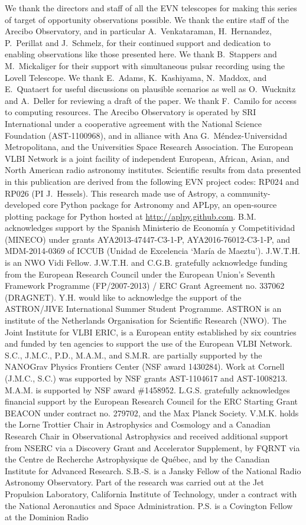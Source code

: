 \documentclass[twocolumn]{aastex61}
\begin{document}
We thank the directors and staff of all the EVN telescopes for making this series of target of opportunity observations possible. We thank the entire staff of the Arecibo Observatory, and in particular A.~Venkataraman, H.~Hernandez, P.~Perillat and J.~Schmelz, for their continued support and dedication to enabling observations like those presented here.  We thank B.~Stappers and M.~Mickaliger for their support with simultaneous pulsar recording using the Lovell Telescope. We thank E.~Adams, K.~Kashiyama, N.~Maddox, and E.~Quataert for useful discussions on plausible scenarios as well as O.~Wucknitz and A.~Deller for reviewing a draft of the paper. We thank F.~Camilo for access to computing resources.  The Arecibo Observatory is operated by SRI International under a cooperative agreement with the National Science Foundation (AST-1100968), and in alliance with Ana G.~M\'{e}ndez-Universidad Metropolitana, and the Universities Space Research Association. The European VLBI Network is a joint facility of independent European, African, Asian, and North American radio astronomy institutes. Scientific results from data presented in this publication are derived from the following EVN project codes: RP024 and RP026 (PI J.~Hessels).  This research made use of Astropy, a community-developed core Python package for Astronomy \citep{astropy2013} and APLpy, an open-source plotting package for Python hosted at \url{http://aplpy.github.com}.  B.M. acknowledges support by the Spanish Ministerio de Econom\'ia y Competitividad (MINECO) under grants AYA2013-47447-C3-1-P, AYA2016-76012-C3-1-P, and MDM-2014-0369 of ICCUB (Unidad de Excelencia `Mar\'ia de Maeztu').  J.W.T.H. is an NWO Vidi Fellow. J.W.T.H. and C.G.B. gratefully acknowledge funding from the European Research Council under the European Union's Seventh Framework Programme (FP/2007-2013) / ERC Grant Agreement no. 337062 (DRAGNET).  Y.H. would like to acknowledge the support of the ASTRON/JIVE International Summer Student Programme. ASTRON is an institute of the Netherlands Organisation for Scientific Research (NWO). The Joint Institute for VLBI ERIC, is a European entity established by six countries and funded by ten agencies to support the use of the European VLBI Network.  S.C., J.M.C., P.D., M.A.M., and S.M.R. are partially supported by the NANOGrav Physics Frontiers Center (NSF award 1430284). Work at Cornell (J.M.C., S.C.) was supported by NSF grants AST-1104617 and AST-1008213.  M.A.M. is supported by NSF award \#1458952.  L.G.S. gratefully acknowledges financial support by the European Research Council for the ERC Starting Grant BEACON under contract no. 279702, and the Max Planck Society.  V.M.K. holds the Lorne Trottier Chair in Astrophysics and Cosmology and a Canadian Research Chair in Observational Astrophysics and received additional support from NSERC via a Discovery Grant and Accelerator Supplement, by FQRNT via the Centre de Recherche Astrophysique de Qu\'ebec, and by the Canadian Institute for Advanced Research.  S.B.-S. is a Jansky Fellow of the National Radio Astronomy Observatory.  Part of the research was carried out at the Jet Propulsion Laboratory, California Institute of Technology, under a contract with the National Aeronautics and Space Administration.  P.S. is a Covington Fellow at the Dominion Radio 
\end{document}
